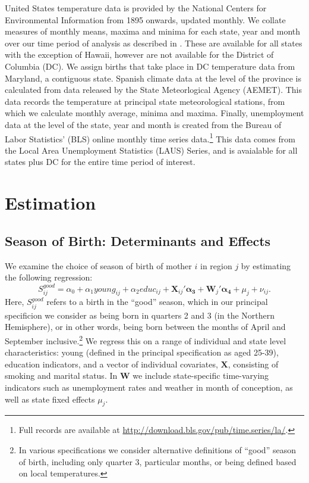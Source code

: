 \documentclass[a4paper, 11 pt]{article}
\theoremstyle{plain}
\begin{document}
\begin{spacing}{1.4}
United States temperature data is provided by the National Centers for 
Environmental Information from 1895 onwards, updated monthly.  We collate 
measures of monthly means, maxima and minima for each state, year and month 
over our time period of analysis as described in \citet{Voseetal2014}. These are 
available for all states with the exception of Hawaii, however are not available 
for the District of Columbia (DC). We assign births that take place in DC 
temperature data from Maryland, a contiguous state.  Spanish climate data at the 
level of the province is calculated from data released by the State Meteorlogical 
Agency (AEMET). This data records the temperature at principal state 
meteorological stations, from which we calculate monthly average, minima and 
maxima. Finally, unemployment data at the level of the state, year and month is 
created from the Bureau of Labor Statistics' (BLS) online monthly time series 
data.\footnote{Full records are available at 
\href{http://download.bls.gov/pub/time.series/la/}%
{http://download.bls.gov/pub/time.series/la/}.} This data comes from the Local 
Area Unemployment Statistics (LAUS) Series, and is avaialable for all states 
plus DC for the entire time period of interest.

\section{Estimation}
\subsection{Season of Birth: Determinants and Effects}
We examine the choice of season of birth of mother $i$ in region $j$ by 
estimating the following regression:
\begin{equation}
\label{eqn:season}
S^{good}_{ij} = \alpha_0 + \alpha_1 young_{ij} + \alpha_2 educ_{ij}  + 
\mathbf{X}_{ij}'\mathbf{\alpha_3} + \mathbf{W}_{j}'\mathbf{\alpha_4} + 
\mu_j +\nu_{ij}. 
\end{equation}
Here, $S^{good}_{ij}$ refers to a birth in the ``good'' season, which in our
principal specificion we consider as being born in quarters 2 and 3 (in the 
Northern Hemisphere), or in other words, being born between the months of April
and September inclusive.\footnote{In various specifications we consider 
alternative definitions of ``good'' season of birth, including only quarter 3,
particular months, or being defined based on local temperatures.}  We regress 
this on a range of individual and state level characteristics: young (defined
in the principal specification as aged 25-39), education indicators, and a 
vector of individual covariates, $\mathbf{X}$, consisting of smoking and marital 
status.  In $\mathbf{W}$ we include state-specific time-varying indicators such 
as unemployment rates and weather in month of conception, as well as state fixed 
effects $\mu_j$.


\end{spacing}
\end{document}
